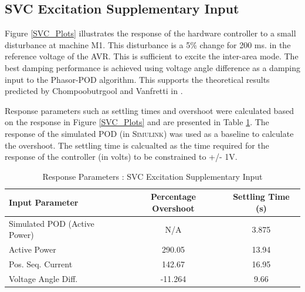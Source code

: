 \documentclass[journal]{IEEEtran}
\begin{document}
\subsection{SVC Excitation Supplementary Input}
Figure \ref{SVC_Plots} illustrates the response of the hardware controller to a small disturbance at machine M1. This disturbance is a 5\% change for 200 ms. in the reference voltage of the AVR. This is sufficient to excite the inter-area mode. The best damping performance is achieved using voltage angle difference as a damping input to the Phasor-POD algorithm. This supports the theoretical results predicted by Chompoobutrgool and Vanfretti in \cite{Yuwa}. %

Response parameters such as settling times and overshoot were calculated based on the response in Figure \ref{SVC_Plots} and are presented in Table \ref{SVCResponseTable}. The response of the simulated POD (in \textsc{Simulink}) was used as a baseline to calculate the overshoot. The settling time is calcualted as the time required for the response of the controller (in volts) to be constrained to +/- 1V.

\begin{table}[!ht]
\caption{Response Parameters : SVC Excitation Supplementary Input}\label{SVCResponseTable}
\begin{center}
\begin{tabular}{|l|c|c|}
\hline \textbf{Input Parameter} & \textbf{Percentage Overshoot} & \textbf{Settling Time (s)} \\
\hline Simulated POD (Active Power)& N/A & 3.875 \\ 
\hline Active Power & 290.05 & 13.94 \\ 
\hline Pos. Seq. Current & 142.67 & 16.95\\ 
\hline Voltage Angle Diff. & -11.264 & 9.66\\ 
\hline 
\end{tabular}
\end{center}
\end{table}  

\end{document}
